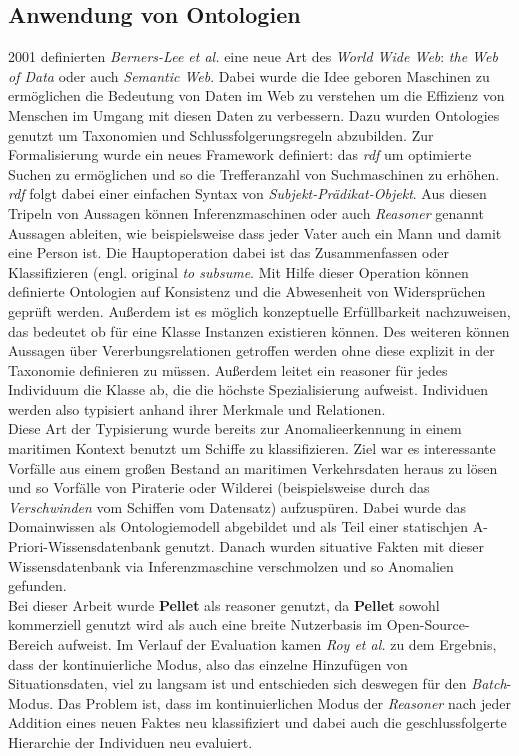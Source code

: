 \subsection{Anwendung von Ontologien}
2001 definierten \textit{Berners-Lee et al.}\cite{berners2001semantic} eine neue Art des \textit{World Wide Web}: \textit{the Web of Data} oder auch \textit{Semantic Web}. Dabei wurde die Idee geboren Maschinen zu ermöglichen die Bedeutung von Daten im Web zu verstehen um die Effizienz von Menschen im Umgang mit diesen Daten zu verbessern\cite{lasi2014industry}. Dazu wurden \Glspl{Ontologie} genutzt um Taxonomien und Schlussfolgerungsregeln abzubilden. Zur Formalisierung wurde ein neues Framework definiert: das \textit{\Gls{rdf}} um optimierte Suchen zu ermöglichen und so die Trefferanzahl von Suchmaschinen zu erhöhen\cite{feilmayr2016analysis}. \textit{\Gls{rdf}} folgt dabei einer einfachen Syntax von \textit{Subjekt-Prädikat-Objekt}. Aus diesen Tripeln von Aussagen können Inferenzmaschinen oder auch \textit{Reasoner} genannt Aussagen ableiten, wie beispielsweise dass jeder Vater auch ein Mann und damit eine Person ist\cite{roy2010exploitation}. Die Hauptoperation dabei ist das Zusammenfassen oder Klassifizieren (engl. original \textit{to subsume}. Mit Hilfe dieser Operation können definierte Ontologien auf Konsistenz und die Abwesenheit von Widersprüchen geprüft werden. Außerdem ist es möglich konzeptuelle Erfüllbarkeit nachzuweisen, das bedeutet ob für eine Klasse Instanzen existieren können. Des weiteren können Aussagen über Vererbungsrelationen getroffen werden ohne diese explizit in der Taxonomie definieren zu müssen. Außerdem leitet ein \Gls{reasoner} für jedes Individuum die Klasse ab, die die höchste Spezialisierung aufweist. Individuen werden also typisiert anhand ihrer Merkmale und Relationen\cite{roy2010exploitation}.\\
Diese Art der Typisierung wurde bereits zur Anomalieerkennung in einem maritimen Kontext benutzt um Schiffe zu klassifizieren. Ziel war es interessante Vorfälle aus einem großen Bestand an maritimen Verkehrsdaten heraus zu lösen und so Vorfälle von Piraterie oder Wilderei (beispielsweise durch das \textit{Verschwinden} vom Schiffen vom Datensatz) aufzuspüren\cite{roy2010exploitation}. Dabei wurde das Domainwissen als Ontologiemodell abgebildet und als Teil einer statischjen A-Priori-Wissensdatenbank genutzt. Danach wurden situative Fakten mit dieser Wissensdatenbank via Inferenzmaschine verschmolzen und so Anomalien gefunden.\\
Bei dieser Arbeit wurde \textbf{Pellet}\cite{pellet} als \Gls{reasoner} genutzt, da \textbf{Pellet} sowohl kommerziell genutzt wird als auch eine breite Nutzerbasis im Open-Source-Bereich aufweist. Im Verlauf der Evaluation kamen \textit{Roy et al.} zu dem Ergebnis, dass der kontinuierliche Modus, also das einzelne Hinzufügen von Situationsdaten, viel zu langsam ist und entschieden sich deswegen für den \textit{Batch}-Modus. Das Problem ist, dass im kontinuierlichen Modus der \textit{Reasoner} nach jeder Addition eines neuen Faktes neu klassifiziert und dabei auch die geschlussfolgerte Hierarchie der Individuen neu evaluiert\cite[p.~4]{roy2010exploitation}.\\